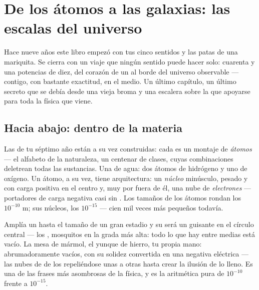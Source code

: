 \chapter{De los átomos a las galaxias: las escalas del universo}\label{ch:g9:atoms-to-galaxies}

Hace nueve años este libro empezó con tus cinco sentidos y las patas de
una mariquita. Se cierra con un viaje que ningún sentido puede hacer
solo: cuarenta y una potencias de diez, del corazón de un
 al borde del universo observable --- contigo, con bastante
exactitud, en el medio. Un último capítulo, un último secreto que se
debía desde una vieja broma y una escalera sobre la que apoyarse para
toda la física que viene.

\section{Hacia abajo: dentro de la materia}

\begin{definition}\label{def:g9:atoms-to-galaxies:atom}
Las  de tu séptimo año están a su vez construidas: cada
 es un montaje de \emph{átomos} --- el
alfabeto de la naturaleza, un centenar de clases, cuyas combinaciones
deletrean todas las sustancias. Una  de agua: dos átomos
de hidrógeno y uno de oxígeno. Un átomo, a su vez, tiene arquitectura:
un \emph{núcleo} minúsculo, pesado y con carga positiva
en el centro y, muy por fuera de él, una nube de
\emph{electrones} --- portadores de carga negativa casi
sin . Los tamaños de los átomos rondan los $10^{-10}$ \unit{m}; sus
núcleos, los $10^{-15}$ --- cien mil veces más pequeños todavía.
\end{definition}

\begin{proposition}\label{prop:g9:atoms-to-galaxies:empty}
Amplía un  hasta el tamaño de un gran estadio y su
 será un guisante en el círculo central --- los
, mosquitos en la grada más alta: todo lo que hay entre
medias está vacío. La mesa de mármol, el yunque de hierro, tu propia
mano: abrumadoramente vacíos, con su solidez convertida en una negativa
eléctrica --- las nubes de  de los  repeliéndose
unas a otras hasta crear la ilusión de lo lleno. Es una de las frases
más asombrosas de la física, y es la aritmética pura de $10^{-10}$
frente a $10^{-15}$.
\end{proposition}

